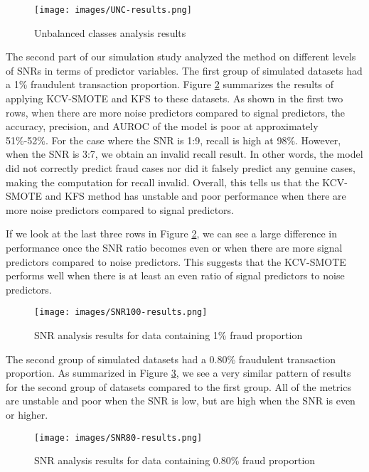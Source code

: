 \documentclass[a4paper, 12pt]{article}
\begin{document}
\begin{figure}[h]
\begin{center}
\texttt{[image: images/UNC-results.png]}
\caption{Unbalanced classes analysis results}
\label{fig:uncResults}
\end{center}
\end{figure}

The second part of our simulation study analyzed the method on different levels of SNRs in terms of predictor variables. The first group of simulated datasets had a 1\% fraudulent transaction proportion. Figure \ref{fig:snr100Results} summarizes the results of applying KCV-SMOTE and KFS to these datasets. As shown in the first two rows, when there are more noise predictors compared to signal predictors, the accuracy, precision, and AUROC of the model is poor at approximately 51\%-52\%. For the case where the SNR is 1:9, recall is high at 98\%. However, when the SNR is 3:7, we obtain an invalid recall result. In other words, the model did not correctly predict fraud cases nor did it falsely predict any genuine cases, making the computation for recall invalid. Overall, this tells us that the KCV-SMOTE and KFS method has unstable and poor performance when there are more noise predictors compared to signal predictors.

If we look at the last three rows in Figure \ref{fig:snr100Results}, we can see a large difference in performance once the SNR ratio becomes even or when there are more signal predictors compared to noise predictors. This suggests that the KCV-SMOTE performs well when there is at least an even ratio of signal predictors to noise predictors.

\begin{figure}[h]
\begin{center}
\texttt{[image: images/SNR100-results.png]}
\caption{SNR analysis results for data containing 1\% fraud proportion}
\label{fig:snr100Results}
\end{center}
\end{figure}

The second group of simulated datasets had a 0.80\% fraudulent transaction proportion. As summarized in Figure \ref{fig:snr80Results}, we see a very similar pattern of results for the second group of datasets compared to the first group. All of the metrics are unstable and poor when the SNR is low, but are high when the SNR is even or higher.

\begin{figure}[H]
\begin{center}
\texttt{[image: images/SNR80-results.png]}
\caption{SNR analysis results for data containing 0.80\% fraud proportion}
\label{fig:snr80Results}
\end{center}
\end{figure}
\end{document}
